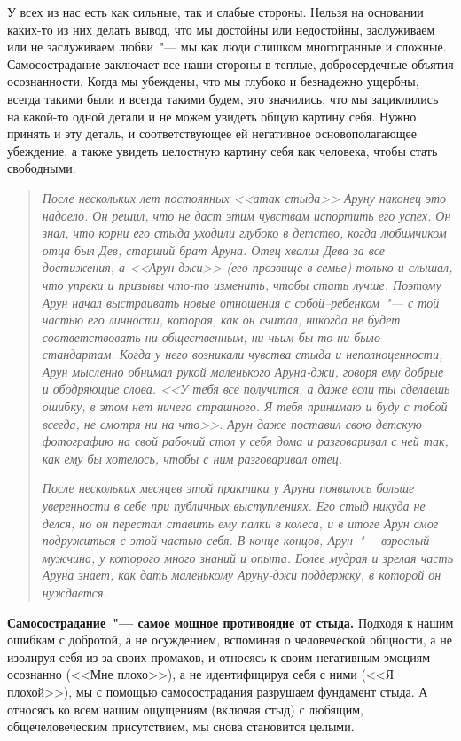 У всех из нас есть как сильные, так и слабые стороны. Нельзя на основании каких-то из них делать вывод, что мы достойны или недостойны, заслуживаем или не заслуживаем любви~"--- мы как люди слишком многогранные и сложные. Самосострадание заключает все наши стороны в теплые, добросердечные объятия осознанности. Когда мы убеждены, что мы глубоко и безнадежно ущербны, всегда такими были и всегда такими будем, это значились, что мы зациклились на какой-то одной детали и не можем увидеть общую картину себя.  Нужно принять и эту деталь, и соответствующее ей негативное основополагающее убеждение, а также увидеть целостную картину себя как человека, чтобы стать свободными. 

\begin{quotation}
	\textit{
		После нескольких лет постоянных <<атак стыда>> Аруну наконец это надоело. Он решил, что не даст этим чувствам испортить его успех. Он знал, что корни его стыда уходили глубоко в детство, когда любимчиком отца был Дев, старший брат Аруна. Отец хвалил Дева за все достижения, а <<Арун-джи>> (его прозвище в семье) только и слышал, что упреки и призывы что-то изменить, чтобы стать лучше. Поэтому Арун начал выстраивать новые отношения с собой--ребенком~"--- с той частью его личности, которая, как он считал, никогда не будет соответствовать ни общественным, ни чьим бы то ни было стандартам. Когда у него возникали чувства стыда и неполноценности, Арун мысленно обнимал рукой маленького Аруна-джи, говоря ему добрые и ободряющие слова. <<У тебя все получится, а даже если ты сделаешь ошибку, в этом нет ничего страшного. Я тебя принимаю и буду с тобой всегда, не смотря ни на что>>. Арун даже поставил свою детскую фотографию на свой рабочий стол у себя дома и разговаривал с ней так, как ему бы хотелось, чтобы с ним разговаривал отец.
	}
	
	\textit{
		После нескольких месяцев этой практики у Аруна появилось больше уверенности в себе при публичных выступлениях. Его стыд никуда не делся, но он перестал ставить ему палки в колеса, и в итоге Арун смог подружиться с этой частью себя. В конце концов, Арун~"--- взрослый мужчина, у которого много знаний и опыта. Более мудрая и зрелая часть Аруна знает, как дать маленькому Аруну-джи поддержку, в которой он нуждается.
	}
\end{quotation}

\textbf{Самосострадание~"--- самое мощное противоядие от стыда.} Подходя к нашим ошибкам с добротой, а не осуждением, вспоминая о человеческой общности, а не изолируя себя из-за своих промахов, и относясь к своим негативным эмоциям осознанно (<<Мне плохо>>), а не идентифицируя себя с ними (<<Я плохой>>), мы с помощью самосострадания разрушаем фундамент стыда. А относясь ко всем нашим ощущениям (включая стыд) с любящим, общечеловеческим присутствием, мы снова становится целыми. 

